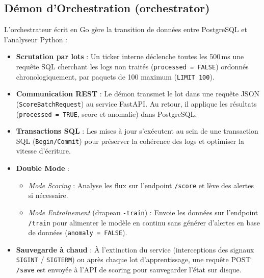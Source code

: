 \documentclass[11pt,a4paper]{article}
\begin{document}
\subsection{Démon d'Orchestration (orchestrator)}
L'orchestrateur écrit en Go gère la transition de données entre PostgreSQL et l'analyseur Python :
\begin{itemize}
    \item \textbf{Scrutation par lots} : Un ticker interne déclenche toutes les 500\,ms une requête SQL cherchant les logs non traités (\texttt{processed = FALSE}) ordonnés chronologiquement, par paquets de 100 maximum (\texttt{LIMIT 100}).
    \item \textbf{Communication REST} : Le démon transmet le lot dans une requête JSON (\texttt{ScoreBatchRequest}) au service FastAPI. Au retour, il applique les résultats (\texttt{processed = TRUE}, score et anomalie) dans PostgreSQL.
    \item \textbf{Transactions SQL} : Les mises à jour s'exécutent au sein de une transaction SQL (\texttt{Begin/Commit}) pour préserver la cohérence des logs et optimiser la vitesse d'écriture.
    \item \textbf{Double Mode} :
    \begin{itemize}
        \item \textit{Mode Scoring} : Analyse les flux sur l'endpoint \texttt{/score} et lève des alertes si nécessaire.
        \item \textit{Mode Entraînement} (drapeau \texttt{-train}) : Envoie les données sur l'endpoint \texttt{/train} pour alimenter le modèle en continu sans générer d'alertes en base de données (\texttt{anomaly = FALSE}).
    \end{itemize}
    \item \textbf{Sauvegarde à chaud} : À l'extinction du service (interceptions des signaux \texttt{SIGINT} / \texttt{SIGTERM}) ou après chaque lot d'apprentissage, une requête POST \texttt{/save} est envoyée à l'API de scoring pour sauvegarder l'état sur disque.
\end{itemize}
\end{document}
